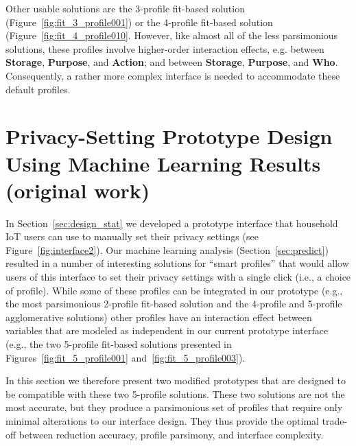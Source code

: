 Other usable solutions are the 3-profile fit-based solution (Figure~\ref{fig:fit_3_profile001}) or the 4-profile fit-based solution (Figure~\ref{fig:fit_4_profile010}. However, like almost all of the less parsimonious solutions, these profiles involve higher-order interaction effects, e.g. between \textbf{Storage}, \textbf{Purpose}, and \textbf{Action}; and between \textbf{Storage}, \textbf{Purpose}, and \textbf{Who}. Consequently, a rather more complex interface is needed to accommodate these default profiles.

\section{Privacy-Setting Prototype Design Using Machine Learning Results (original work)}\label{sec:design_ml}
In Section~\ref{sec:design_stat} we developed a prototype interface that household IoT users can use to manually set their privacy settings (see Figure~\ref{fig:interface2}). Our machine learning analysis (Section~\ref{sec:predict}) resulted in a number of interesting solutions for ``smart profiles'' that would allow users of this interface to set their privacy settings with a single click (i.e., a choice of profile). While some of these profiles can be integrated in our prototype (e.g., the most parsimonious 2-profile fit-based solution and the 4-profile and 5-profile agglomerative solutions) other profiles have an interaction effect between variables that are modeled as independent in our current prototype interface (e.g., the two 5-profile fit-based solutions presented in Figures~\ref{fig:fit_5_profile001} and~\ref{fig:fit_5_profile003}).

In this section we therefore present two modified prototypes that are designed to be compatible with these two 5-profile solutions. These two solutions are not the most accurate, but they produce a parsimonious set of profiles that require only minimal alterations to our interface design. They thus provide the optimal trade-off between reduction accuracy, profile parsimony, and interface complexity.

